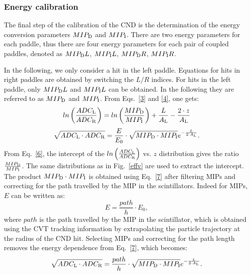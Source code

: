 \subsubsection{Energy calibration }\label{sec_energy_cal}

The final step of the calibration of the CND is the determination of the energy conversion parameters $MIP_{\rm{D}}$ and $MIP_{\rm{I}}$. There are two energy parameters for each paddle, thus there are four energy parameters for each pair of coupled paddles, denoted as $MIP_{\rm{D}}L$, $MIP_{\rm{I}}L$, $MIP_{\rm{D}}R$, $MIP_{\rm{I}}R$.

In the following, we only consider a hit in the left paddle. Equations for hits in right paddles are obtained by switching the $L/R$ indices. For hits in the left paddle, only $MIP_{\rm{D}}L$ and $MIP_{\rm{I}}L$ can be obtained. In the following they are referred to as $MIP_{\rm{D}}$ and $MIP_{\rm{I}}$. From Eqs.~\ref{3} and \ref{4}, one gets:
\begin{equation}
\label{6}
ln\left(\frac{ADC_{\rm{L}}}{ADC_{\rm{R}}}\right)=ln\left(\frac{MIP_{\rm{D}}}{MIP_{\rm{I}}}\right)+{\frac{L}{A_{\rm{L}}}}-\frac{2\cdot z}{A_{\rm{L}}}
\end{equation}
\begin{equation}
\label{7}
\sqrt{ADC_{\rm{L}}\cdot ADC_{\rm{R}}}=\frac{E}{E_0}\cdot \sqrt{MIP_{\rm{D}}\cdot MIP_{\rm{I}}} e^{-\frac{L}{2\cdot A_{\rm{L}}}}.
\end{equation}
From Eq.~\ref{6}, the intercept of the $ln\left(\frac{ADC_{\rm{L}}}{ADC_{\rm{R}}}\right)$ vs. $z$ distribution gives the ratio $\frac{MIP_{\rm{D}}}{MIP_{\rm{I}}}$. The same distributions as in Fig.~\ref{effv} are used to extract the intercept. The product $MIP_{\rm{D}}\cdot MIP_{\rm{I}}$ is obtained using Eq.~\ref{7} after filtering MIPs and correcting for the path travelled by the MIP in the scintillators. Indeed for MIPs, $E$ can be written as:
\begin{equation}
E=\frac{path}{h}\cdot E_0,
\end{equation}
where $path$ is the path travelled by the MIP in the scintillator, which is obtained using the CVT tracking information by extrapolating the particle trajectory at the radius of the CND hit.
Selecting MIPs and correcting for the path length removes the energy dependence from Eq.~\ref{7}, which becomes:
\begin{equation}
\sqrt{ADC_{\rm{L}}\cdot ADC_{\rm{R}}}=\frac{path}{h}\cdot \sqrt{MIP_{\rm{D}}\cdot MIP_{\rm{I}}} e^{-\frac{L}{2\cdot A_{\rm{L}}}} .
\end{equation}

